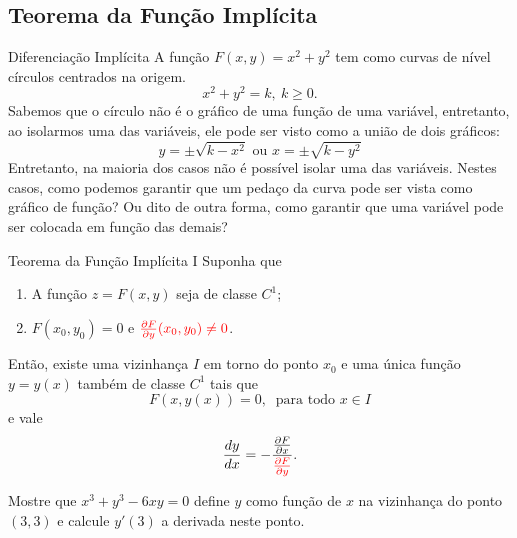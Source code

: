 \subsection*{Teorema da Função Implícita}

\begin{frame}[label=der-parciais]{Diferenciação Implícita}
A função $F(x,y)=x^2+y^2$ tem como curvas de nível círculos centrados na origem.
\[x^2+y^2=k,\ k\geq 0.\]
 Sabemos que o círculo não é o gráfico de uma função de uma variável, entretanto, ao isolarmos uma das variáveis, ele pode ser visto como a união de dois gráficos:
 \[y=\pm\sqrt{k-x^2} \text{ ou } x=\pm\sqrt{k-y^2}\]
Entretanto, na maioria dos casos não é possível isolar uma das variáveis. Nestes casos, como podemos garantir que um pedaço da curva pode ser vista como gráfico de função? Ou dito de outra forma, como garantir que uma variável pode ser colocada em função das demais?
\end{frame}

\begin{frame}[label=der-parciais]{Teorema da Função Implícita I}
Suponha que 
\begin{enumerate}
\item A função $z=F(x,y)$ seja de {\color{blue}classe $C^1$};

\item $F(x_0,y_0)=0$ e ${\color{red}\frac{\partial F}{\partial y}(x_0,y_0)\neq 0}$.
\end{enumerate}
Então, existe uma vizinhança $I$ em torno do ponto $x_0$ e uma {\color{blue}única} função $y=y(x)$ {\color{blue}também de classe $C^1$} tais que 
\[F(x,y(x))=0,\ \text{ para todo } x\in I \]
 e vale
 \[   {\frac{dy}{dx}}=\displaystyle -\frac{\frac{\partial F}{\partial x}}{{\color{red}{\frac{\partial F}{\partial y}}}}.\] 

\begin{exe}
Mostre que $x^3+y^3-6xy=0$ define $y$ como função de $x$ na vizinhança do ponto $(3,3)$ e calcule $y'(3)$ a derivada neste ponto.
\end{exe}

\end{frame}



